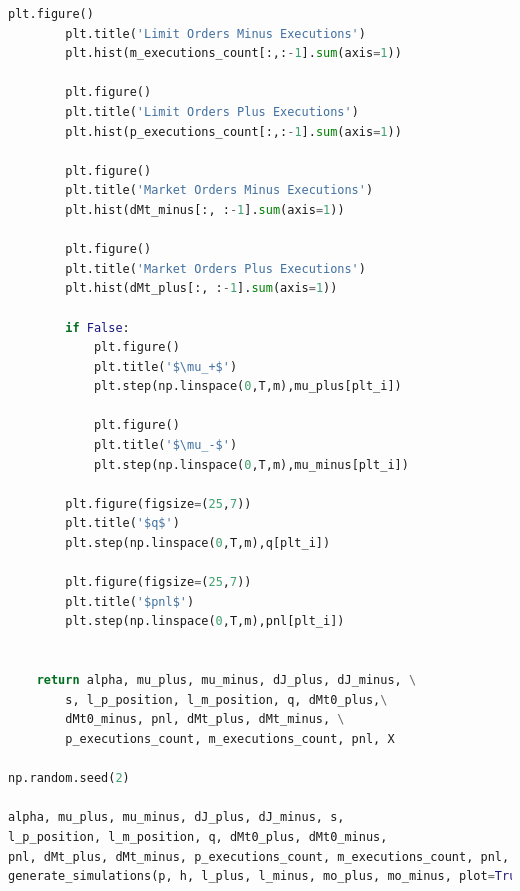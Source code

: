 \documentclass[12pt,a4paper,spanish]{article}%
\begin{document}
\begin{appendices}
\begin{lstlisting}[language=Python]
        plt.figure()
        plt.title('Limit Orders Minus Executions')
        plt.hist(m_executions_count[:,:-1].sum(axis=1))
        
        plt.figure()
        plt.title('Limit Orders Plus Executions')
        plt.hist(p_executions_count[:,:-1].sum(axis=1))

        plt.figure()
        plt.title('Market Orders Minus Executions')
        plt.hist(dMt_minus[:, :-1].sum(axis=1))
        
        plt.figure()
        plt.title('Market Orders Plus Executions')
        plt.hist(dMt_plus[:, :-1].sum(axis=1))

        if False:
            plt.figure()
            plt.title('$\mu_+$')
            plt.step(np.linspace(0,T,m),mu_plus[plt_i])

            plt.figure()
            plt.title('$\mu_-$')
            plt.step(np.linspace(0,T,m),mu_minus[plt_i])
        
        plt.figure(figsize=(25,7))
        plt.title('$q$')
        plt.step(np.linspace(0,T,m),q[plt_i])

        plt.figure(figsize=(25,7))
        plt.title('$pnl$')
        plt.step(np.linspace(0,T,m),pnl[plt_i])
        
        
    return alpha, mu_plus, mu_minus, dJ_plus, dJ_minus, \
    	s, l_p_position, l_m_position, q, dMt0_plus,\
    	dMt0_minus, pnl, dMt_plus, dMt_minus, \
    	p_executions_count, m_executions_count, pnl, X

np.random.seed(2)

alpha, mu_plus, mu_minus, dJ_plus, dJ_minus, s, 
l_p_position, l_m_position, q, dMt0_plus, dMt0_minus,
pnl, dMt_plus, dMt_minus, p_executions_count, m_executions_count, pnl, X = 
generate_simulations(p, h, l_plus, l_minus, mo_plus, mo_minus, plot=True)
\end{lstlisting}
\end{appendices}
\end{document}
